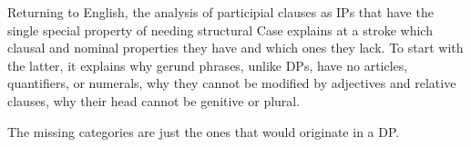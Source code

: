 \documentclass[output=paper,
modfonts
]{LSP/langsci}
\begin{document}
Returning to English, the analysis of participial clauses as IPs that have the single special
property of needing structural Case explains at a stroke which clausal and nominal properties
they have and which ones they lack.  To start with the latter, it explains why gerund phrases,
unlike DPs, have no articles, quantifiers, or numerals, why they cannot be modified by
adjectives and relative clauses, why their head cannot be genitive or
plural.\begin{exe}
\ex\label{noo}
	\begin{xlist}
	\end{xlist}
\end{exe}
The missing categories are just the ones that would originate in a DP.
\end{document}
